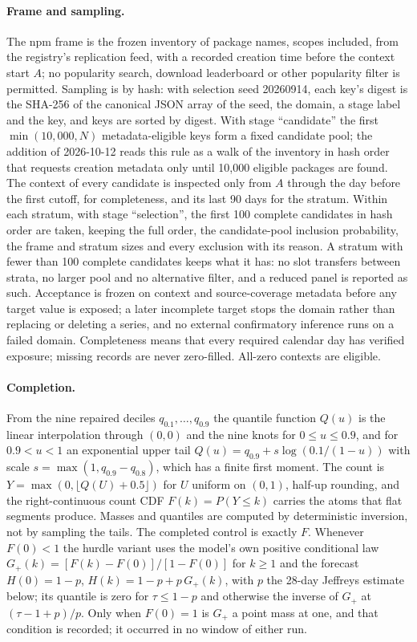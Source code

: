 \paragraph{Frame and sampling.} The npm frame is the frozen inventory of package names, scopes included,
from the registry's replication feed, with a recorded creation time before the context start $A$; no
popularity search, download leaderboard or other popularity filter is permitted. Sampling is by hash:
with selection seed 20260914, each key's digest is the SHA-256 of the canonical JSON array of the seed, the
domain, a stage label and the key, and keys are sorted by digest. With stage ``candidate'' the first
$\min(10{,}000, N)$ metadata-eligible keys form a fixed candidate pool; the addition of 2026-10-12 reads
this rule as a walk of the inventory in hash order that requests creation metadata only until 10,000
eligible packages are found. The context of every candidate is inspected only from $A$ through the day
before the first cutoff, for completeness, and its last 90 days for the stratum. Within each stratum, with
stage ``selection'', the first 100 complete candidates in hash order are taken, keeping the full order, the
candidate-pool inclusion probability, the frame and stratum sizes and every exclusion with its reason. A
stratum with fewer than 100 complete candidates keeps what it has: no slot transfers between strata, no
larger pool and no alternative filter, and a reduced panel is reported as such. Acceptance is frozen on
context and source-coverage metadata before any target value is exposed; a later incomplete target stops
the domain rather than replacing or deleting a series, and no external confirmatory inference runs on a
failed domain. Completeness means that every required calendar day has verified exposure; missing records
are never zero-filled. All-zero contexts are eligible.

\paragraph{Completion.} From the nine repaired deciles $q_{0.1}, \dots, q_{0.9}$ the quantile function
$Q(u)$ is the linear interpolation through $(0, 0)$ and the nine knots for $0 \le u \le 0.9$, and for
$0.9 < u < 1$ an exponential upper tail $Q(u) = q_{0.9} + s \log(0.1 / (1 - u))$ with scale
$s = \max(1, q_{0.9} - q_{0.8})$, which has a finite first moment. The count is
$Y = \max(0, \lfloor Q(U) + 0.5 \rfloor)$ for $U$ uniform on $(0, 1)$, half-up rounding, and the
right-continuous count CDF $F(k) = P(Y \le k)$ carries the atoms that flat segments produce. Masses and
quantiles are computed by deterministic inversion, not by sampling the tails. The completed control is
exactly $F$. Whenever $F(0) < 1$ the hurdle variant uses the model's own positive conditional law
$G_+(k) = [F(k) - F(0)] / [1 - F(0)]$ for $k \ge 1$ and the forecast $H(0) = 1 - p$,
$H(k) = 1 - p + p\, G_+(k)$, with $p$ the 28-day Jeffreys estimate below; its quantile is zero for
$\tau \le 1 - p$ and otherwise the inverse of $G_+$ at $(\tau - 1 + p) / p$. Only when $F(0) = 1$ is
$G_+$ a point mass at one, and that condition is recorded; it occurred in no window of either run.

